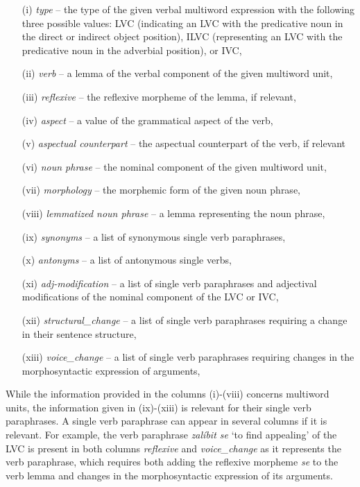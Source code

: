 \documentclass[output=paper
,modfonts
,nonflat]{langsci/langscibook}
\begin{document}
\begin{itemize}
    \item[(i)] \emph{type} -- the type of the given verbal multiword expression 
     with the following three possible values: LVC (indicating an LVC with the 
     predicative noun in the direct or indirect object position), ILVC (representing an LVC 
     with the predicative noun in the adverbial position), or IVC,
   \item[(ii)] \emph{verb} -- a lemma of the verbal component of the given multiword unit,
   \item[(iii)] \emph{reflexive} -- the reflexive morpheme of the lemma, if relevant,
   \item[(iv)] \emph{aspect} -- a value of the grammatical aspect of the verb,
   \item[(v)]  \emph{aspectual counterpart} -- the aspectual counterpart of the verb, if relevant
   \item[(vi)] \emph{noun phrase} -- the nominal component of the given multiword unit,
   \item[(vii)] \emph{morphology} -- the morphemic form of the given noun phrase,
   \item[(viii)] \emph{lemmatized noun phrase} -- a lemma representing the noun phrase,
   \item[(ix)] \emph{synonyms} -- a list of synonymous single verb paraphrases,
   \item[(x)] \emph{antonyms}  -- a list of antonymous single verbs,
   \item[(xi)] \emph{adj-modification} --  a list of single verb paraphrases 
   and adjectival modifications of the nominal component of the LVC or IVC,
   \item[(xii)] \emph{structural\_change} --  a list of single verb paraphrases requiring a change in their sentence structure,
   \item[(xiii)] \emph{voice\_change} --   a list of single verb paraphrases requiring changes in the morphosyntactic expression of arguments,
\end{itemize}
	
While the information provided in the columns (i)-(viii) concerns multiword units, 
the information given in (ix)-(xiii) is relevant for their single verb paraphrases.
A single verb paraphrase can appear in several columns if it is relevant. For example, 
the verb paraphrase \textit{zalíbit se} `to find appealing' of the LVC  is present in both columns 
\emph{reflexive} and \emph{voice\_change} as it represents the verb paraphrase,  
which requires both adding the reflexive morpheme \textit{se} to the verb lemma and 
changes in the morphosyntactic expression of its arguments.
\end{document}
